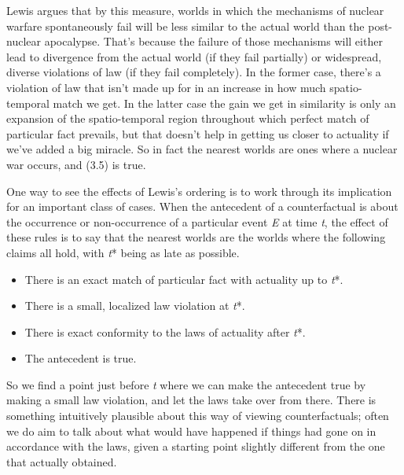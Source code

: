 \noindent Lewis argues that by this measure, worlds in which the mechanisms of nuclear warfare spontaneously fail will be less similar to the actual world than the post-nuclear apocalypse. That's because the failure of those mechanisms will either lead to divergence from the actual world (if they fail partially) or widespread, diverse violations of law (if they fail completely). In the former case, there's a violation of law that isn't made up for in an increase in how much spatio-temporal match we get. In the latter case the gain we get in similarity is only an expansion of the spatio-temporal region throughout which perfect match of particular fact prevails, but that doesn't help in getting us closer to actuality if we've added a big miracle. So in fact the nearest worlds are ones where a nuclear war occurs, and (3.5) is true.

One way to see the effects of Lewis's ordering is to work through its implication for an important class of cases. When the antecedent of a counterfactual is about the occurrence or non-occurrence of a particular event \textit{E} at time \textit{t}, the effect of these rules is to say that the nearest worlds are the worlds where the following claims all hold, with \textit{t}* being as late as possible.

\begin{itemize} 
\item There is an exact match of particular fact with actuality up to \textit{t}*.
\item There is a small, localized law violation at \textit{t}*.
\item There is exact conformity to the laws of actuality after \textit{t}*.
\item The antecedent is true. 
\end{itemize}

\noindent So we find a point just before \textit{t} where we can make the antecedent true by making a small law violation, and let the laws take over from there. There is something intuitively plausible about this way of viewing counterfactuals; often we do aim to talk about what would have happened if things had gone on in accordance with the laws, given a starting point slightly different from the one that actually obtained.

